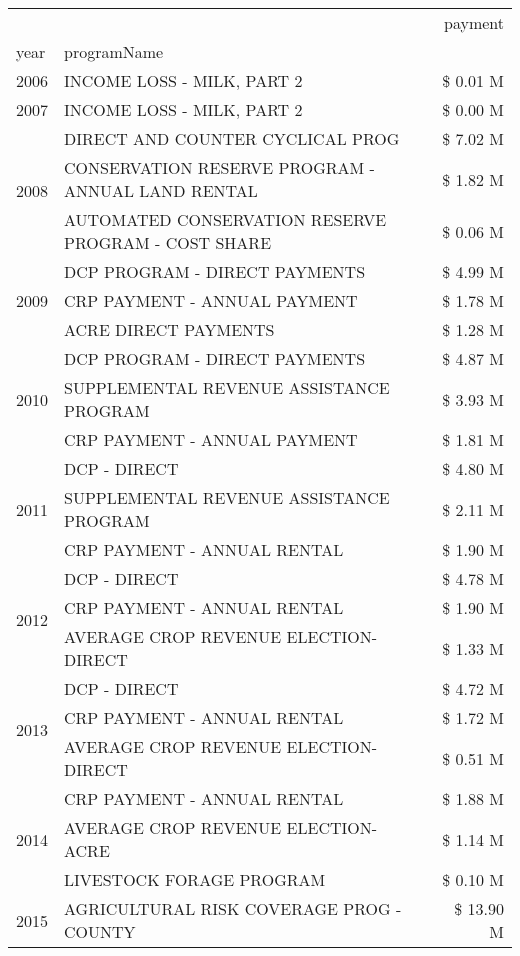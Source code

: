 \begin{tabular}{llr}
\toprule
 &  & payment \\
year & programName &  \\
\midrule
2006 & INCOME LOSS - MILK, PART 2 & \$ 0.01 M \\
\cline{1-3}
2007 & INCOME LOSS - MILK, PART 2 & \$ 0.00 M \\
\cline{1-3}
\multirow[t]{3}{*}{2008} & DIRECT AND COUNTER CYCLICAL PROG & \$ 7.02 M \\
 & CONSERVATION RESERVE PROGRAM - ANNUAL LAND RENTAL & \$ 1.82 M \\
 & AUTOMATED CONSERVATION RESERVE PROGRAM - COST SHARE & \$ 0.06 M \\
\cline{1-3}
\multirow[t]{3}{*}{2009} & DCP PROGRAM - DIRECT PAYMENTS & \$ 4.99 M \\
 & CRP PAYMENT - ANNUAL PAYMENT & \$ 1.78 M \\
 & ACRE DIRECT PAYMENTS & \$ 1.28 M \\
\cline{1-3}
\multirow[t]{3}{*}{2010} & DCP PROGRAM - DIRECT PAYMENTS & \$ 4.87 M \\
 & SUPPLEMENTAL REVENUE ASSISTANCE PROGRAM & \$ 3.93 M \\
 & CRP PAYMENT - ANNUAL PAYMENT & \$ 1.81 M \\
\cline{1-3}
\multirow[t]{3}{*}{2011} & DCP - DIRECT & \$ 4.80 M \\
 & SUPPLEMENTAL REVENUE ASSISTANCE PROGRAM & \$ 2.11 M \\
 & CRP PAYMENT - ANNUAL RENTAL & \$ 1.90 M \\
\cline{1-3}
\multirow[t]{3}{*}{2012} & DCP - DIRECT & \$ 4.78 M \\
 & CRP PAYMENT - ANNUAL RENTAL & \$ 1.90 M \\
 & AVERAGE CROP REVENUE ELECTION-DIRECT & \$ 1.33 M \\
\cline{1-3}
\multirow[t]{3}{*}{2013} & DCP - DIRECT & \$ 4.72 M \\
 & CRP PAYMENT - ANNUAL RENTAL & \$ 1.72 M \\
 & AVERAGE CROP REVENUE ELECTION-DIRECT & \$ 0.51 M \\
\cline{1-3}
\multirow[t]{3}{*}{2014} & CRP PAYMENT - ANNUAL RENTAL & \$ 1.88 M \\
 & AVERAGE CROP REVENUE ELECTION-ACRE & \$ 1.14 M \\
 & LIVESTOCK FORAGE PROGRAM & \$ 0.10 M \\
\cline{1-3}
\multirow[t]{3}{*}{2015} & AGRICULTURAL RISK COVERAGE PROG - COUNTY & \$ 13.90 M \\

\end{tabular}
